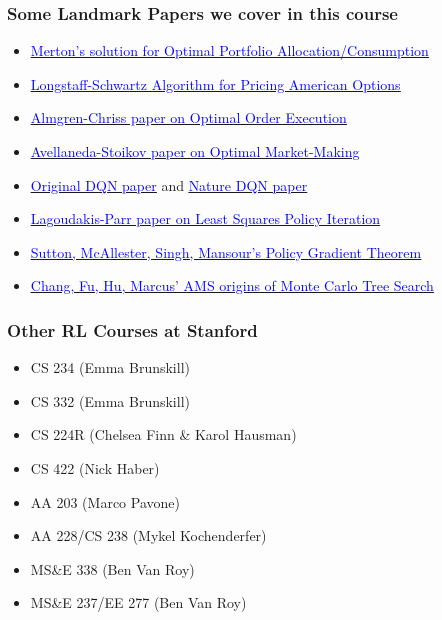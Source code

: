 \documentclass[handout]{beamer}
\begin{document}
\begin{frame}
\frametitle{Some Landmark Papers we cover in this course}
\begin{itemize}
\item \href{https://www.jstor.org/stable/1926560}{\underline{\textcolor{blue}{Merton's solution for Optimal Portfolio Allocation/Consumption}}}
\item \href{https://people.math.ethz.ch/~hjfurrer/teaching/LongstaffSchwartzAmericanOptionsLeastSquareMonteCarlo.pdf}{\underline{\textcolor{blue}{Longstaff-Schwartz Algorithm for Pricing American Options}}}
\item \href{https://pdfs.semanticscholar.org/3d2d/773983c5201b58586af463f045befae5bbf2.pdf}{\underline{\textcolor{blue}{Almgren-Chriss paper on Optimal Order Execution}}}
\item \href{https://www.math.nyu.edu/faculty/avellane/HighFrequencyTrading.pdf}{\underline{\textcolor{blue}{Avellaneda-Stoikov paper on Optimal Market-Making}}}
\item \href{https://www.cs.toronto.edu/~vmnih/docs/dqn.pdf}{\underline{\textcolor{blue}{Original DQN paper}}} and \href{https://storage.googleapis.com/deepmind-media/dqn/DQNNaturePaper.pdf}{\underline{\textcolor{blue}{Nature DQN paper}}}
\item \href{http://www.jmlr.org/papers/volume4/lagoudakis03a/lagoudakis03a.pdf}{\underline{\textcolor{blue}{Lagoudakis-Parr paper on Least Squares Policy Iteration}}}
\item \href{http://papers.nips.cc/paper/1713-policy-gradient-methods-for-reinforcement-learning-with-function-approximation.pdf}{\underline{\textcolor{blue}{Sutton, McAllester, Singh, Mansour's Policy Gradient Theorem}}}
\item \href{https://pdfs.semanticscholar.org/a378/b2895a3e3f6a19cdff1a0ad404b301b5545f.pdf}{\underline{\textcolor{blue}{Chang, Fu, Hu, Marcus' AMS origins of Monte Carlo Tree Search}}}
\end{itemize}
\end{frame}


\begin{frame}
\frametitle{Other RL Courses at Stanford}
\begin{itemize}
\item CS 234 (Emma Brunskill)
\item CS 332 (Emma Brunskill)
\item CS 224R (Chelsea Finn \& Karol Hausman)
\item CS 422 (Nick Haber)
\item AA 203 (Marco Pavone)
\item AA 228/CS 238 (Mykel Kochenderfer)
\item MS\&E 338 (Ben Van Roy)
\item MS\&E 237/EE 277 (Ben Van Roy)
\end{itemize}
\end{frame}
\end{document}

